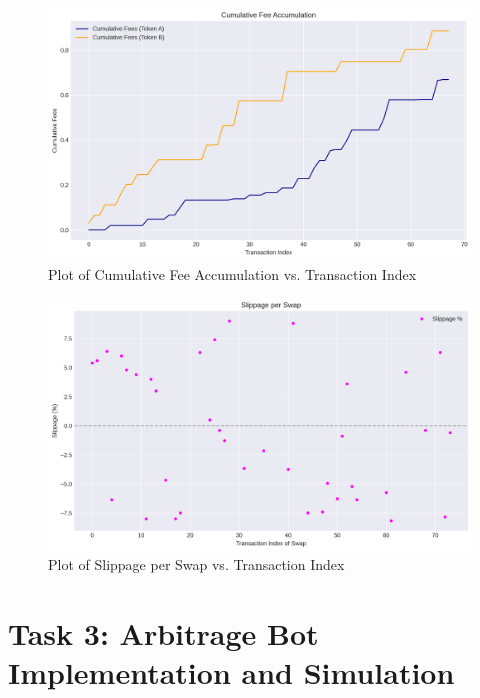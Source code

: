 \documentclass[12pt]{article}
\begin{document}
\begin{figure}[H]
    \centering
    \includegraphics[width=\textwidth]{../task2_plots/fee_accumulation.png}
    \caption{Plot of Cumulative Fee Accumulation vs. Transaction Index}
    \label{fig:fees}
\end{figure}

\begin{figure}[H]
    \centering
    \includegraphics[width=\textwidth]{../task2_plots/slippage.png}
    \caption{Plot of Slippage per Swap vs. Transaction Index}
    \label{fig:slippage}
\end{figure}


\section{Task 3: Arbitrage Bot Implementation and Simulation}
\end{document}
